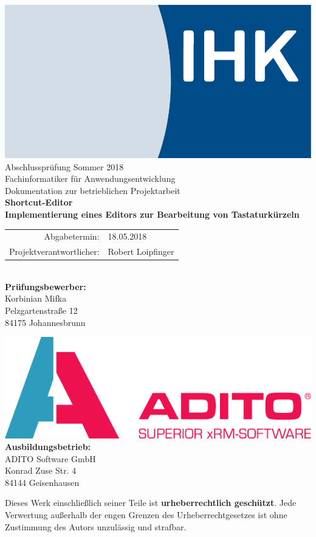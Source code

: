 \begin{titlepage}

\begin{center}
\includegraphics[scale=0.25]{../img/LogoIHK.pdf}\\[1ex]
\Large{Abschlussprüfung Sommer 2018}\\[3ex]

\Large{Fachinformatiker für Anwendungsentwicklung}\\
\LARGE{Dokumentation zur betrieblichen Projektarbeit}\\[4ex]

\huge{\textbf{Shortcut-Editor}}\\[1.5ex]
\Large{\textbf{Implementierung eines Editors zur Bearbeitung von Tastaturkürzeln}}\\[4ex]

\normalsize
\begin{tabularx}{0.54\textwidth}{rl}
Abgabetermin: & 18.05.2018 \\
Projektverantwortlicher: & Robert Loipfinger\\
\end{tabularx}
\\[3em]

\textbf{Prüfungsbewerber:}\\
Korbinian Mifka\\
Pelzgartenstraße 12\\
84175 Johannesbrunn\\

\vfill

\includegraphics[scale=0.7]{../img/ADITO_Logo}\\[2ex]
\textbf{Ausbildungsbetrieb:}\\
ADITO Software GmbH\\
Konrad Zuse Str. 4\\
84144 Geisenhausen\\[5em]
\end{center}

\vfill
\small
\noindent
Dieses Werk einschließlich seiner Teile ist \textbf{urheberrechtlich geschützt}.
Jede Verwertung außerhalb der engen Grenzen des Urheberrechtgesetzes ist ohne
Zustimmung des Autors unzulässig und strafbar.

\end{titlepage}